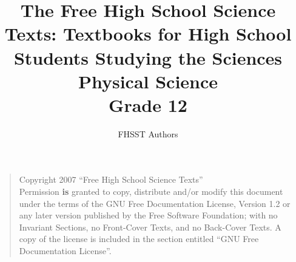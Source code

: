 \documentclass[9pt,a4paper,titlepage,twoside,openany]{extbook}
\begin{document}
\title{The Free High School Science Texts: Textbooks for High School Students Studying the Sciences\\
\textbf{Physical Science}\\
Grade 12}
\author{FHSST Authors}
\maketitle
\begin{quote}
Copyright 2007 ``Free High School Science Texts''\\
Permission \textbf{is} granted to copy, distribute and/or modify this document under the terms of the GNU Free Documentation License, Version 1.2 or any later version published by the Free Software Foundation; with no Invariant Sections, no Front-Cover Texts, and no Back-Cover Texts.
A copy of the license is included in the section entitled ``GNU Free Documentation License''.
\end{quote}
\end{document}
